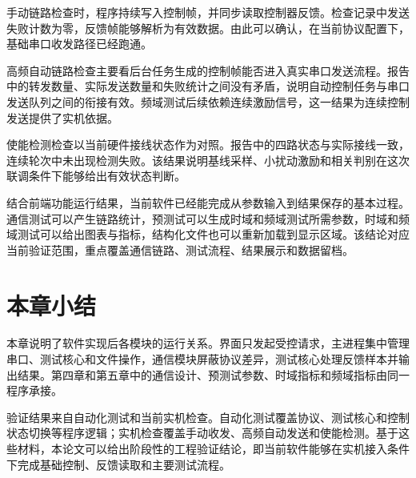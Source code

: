 手动链路检查时，程序持续写入控制帧，并同步读取控制器反馈。检查记录中发送失败计数为零，反馈帧能够解析为有效数据。由此可以确认，在当前协议配置下，基础串口收发路径已经跑通。

高频自动链路检查主要看后台任务生成的控制帧能否进入真实串口发送流程。报告中的转发数量、实际发送数量和失败统计之间没有矛盾，说明自动控制任务与串口发送队列之间的衔接有效。频域测试后续依赖连续激励信号，这一结果为连续控制发送提供了实机依据。

使能检测检查以当前硬件接线状态作为对照。报告中的四路状态与实际接线一致，连续轮次中未出现检测失败。该结果说明基线采样、小扰动激励和相关判别在这次联调条件下能够给出有效状态判断。

结合前端功能运行结果，当前软件已经能完成从参数输入到结果保存的基本过程。通信测试可以产生链路统计，预测试可以生成时域和频域测试所需参数，时域和频域测试可以给出图表与指标，结构化文件也可以重新加载到显示区域。该结论对应当前验证范围，重点覆盖通信链路、测试流程、结果展示和数据留档。

\section{本章小结}

本章说明了软件实现后各模块的运行关系。界面只发起受控请求，主进程集中管理串口、测试核心和文件操作，通信模块屏蔽协议差异，测试核心处理反馈样本并输出结果。第四章和第五章中的通信设计、预测试参数、时域指标和频域指标由同一程序承接。

验证结果来自自动化测试和当前实机检查。自动化测试覆盖协议、测试核心和控制状态切换等程序逻辑；实机检查覆盖手动收发、高频自动发送和使能检测。基于这些材料，本论文可以给出阶段性的工程验证结论，即当前软件能够在实机接入条件下完成基础控制、反馈读取和主要测试流程。
